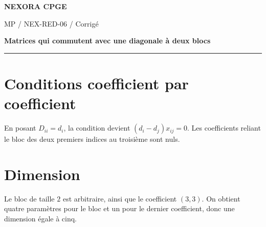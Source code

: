 \documentclass[11pt,a4paper]{article}
\begin{document}
{\small\bfseries\color{nexorablue} NEXORA CPGE}\par
{\small MP / NEX-RED-06 / Corrigé}\par
{\LARGE\bfseries Matrices qui commutent avec une diagonale à deux blocs}\par
\vspace{0.25em}\hrule\vspace{0.6em}

\section*{Conditions coefficient par coefficient}
En posant $D_{ii}=d_i$, la condition devient $(d_i-d_j)x_{ij}=0$. Les coefficients reliant le bloc des deux premiers indices au troisième sont nuls.

\section*{Dimension}
Le bloc de taille $2$ est arbitraire, ainsi que le coefficient $(3,3)$. On obtient quatre paramètres pour le bloc et un pour le dernier coefficient, donc une dimension égale à cinq.
\end{document}
